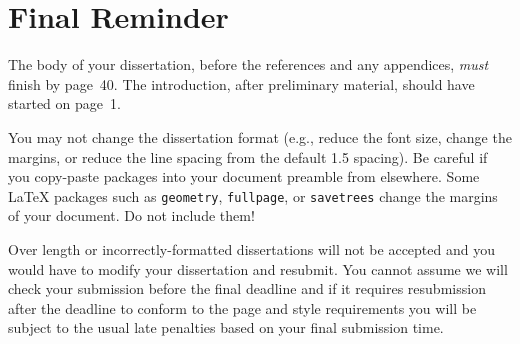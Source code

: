 \documentclass[bsc,frontabs,singlespacing,parskip,deptreport]{infthesis}
\begin{document}
\section{Final Reminder}

The body of your dissertation, before the references and any appendices,
\emph{must} finish by page~40. The introduction, after preliminary material,
should have started on page~1.

You may not change the dissertation format (e.g., reduce the font size, change
the margins, or reduce the line spacing from the default 1.5 spacing). Be
careful if you copy-paste packages into your document preamble from elsewhere.
Some \LaTeX{} packages such as \texttt{geometry}, \texttt{fullpage}, or
\texttt{savetrees} change the margins of your document. Do not include them!

Over length or incorrectly-formatted dissertations will not be accepted and you
would have to modify your dissertation and resubmit. You cannot assume we will
check your submission before the final deadline and if it requires resubmission
after the deadline to conform to the page and style requirements you will be
subject to the usual late penalties based on your final submission time.




%
%
%
\end{document}
